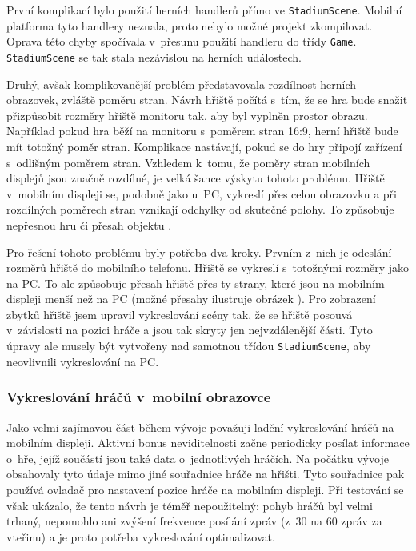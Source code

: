 \documentclass[thesis=B,czech,hidelinks]{FITthesis}[2012/06/26] %
\newcommand{\code}[1]{\texttt{#1}}
\begin{document}
První komplikací bylo použití herních handlerů přímo ve \code{StadiumScene}. Mobilní platforma tyto handlery neznala, proto nebylo možné projekt zkompilovat. Oprava této chyby spočívala v~přesunu použití handleru do třídy \code{Game}. \code{StadiumScene} se tak stala nezávislou na herních událostech.

Druhý, avšak komplikovanější problém představovala rozdílnost herních obrazovek, zvláště poměru stran. Návrh hřiště počítá s~tím, že se hra bude snažit přizpůsobit rozměry hřiště monitoru tak, aby byl vyplněn prostor obrazu. Například pokud hra běží na monitoru s~poměrem stran 16:9, herní hřiště bude mít totožný poměr stran. Komplikace nastávají, pokud se do hry připojí zařízení s~odlišným poměrem stran. Vzhledem k~tomu, že poměry stran mobilních displejů jsou značně rozdílné, je velká šance výskytu tohoto problému. Hřiště v~mobilním displeji se, podobně jako u~PC, vykreslí přes celou obrazovku a při rozdílných poměrech stran vznikají odchylky od skutečné polohy. To způsobuje nepřesnou hru či přesah objektu .

Pro řešení tohoto problému byly potřeba dva kroky. Prvním z~nich je odeslání rozměrů hřiště do mobilního telefonu. Hřiště se vykreslí s~totožnými rozměry jako na PC. To ale způsobuje přesah hřiště přes ty strany, které jsou na mobilním displeji menší než na PC (možné přesahy ilustruje obrázek ). Pro zobrazení zbytků hřiště jsem upravil vykreslování scény tak, že se hřiště posouvá v~závislosti na pozici hráče a jsou tak skryty jen nejvzdálenější části. Tyto úpravy ale musely být vytvořeny nad samotnou třídou \code{StadiumScene}, aby neovlivnili vykreslování na PC.

\subsubsection{Vykreslování hráčů v~mobilní obrazovce}

Jako velmi zajímavou část během vývoje považuji ladění vykreslování hráčů na mobilním displeji. Aktivní bonus neviditelnosti začne periodicky posílat informace o~hře, jejíž součástí jsou také data o~jednotlivých hráčích. Na počátku vývoje obsahovaly tyto údaje mimo jiné souřadnice hráče na hřišti. Tyto souřadnice pak používá ovladač pro nastavení pozice hráče na mobilním displeji. Při testování se však ukázalo, že tento návrh je téměř nepoužitelný: pohyb hráčů byl velmi trhaný, nepomohlo ani zvýšení frekvence posílání zpráv (z~30 na 60 zpráv za vteřinu) a je proto potřeba vykreslování optimalizovat.
\end{document}

